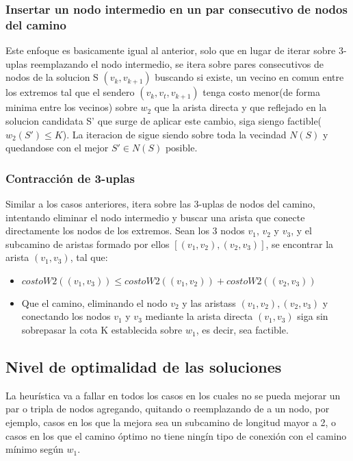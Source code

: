 \subsubsection{Insertar un nodo intermedio en un par consecutivo de nodos del camino}
Este enfoque es basicamente igual al anterior, solo que en lugar de iterar sobre 3-uplas reemplazando el nodo intermedio, se itera sobre pares consecutivos de nodos de la solucion S $(v_k, v_{k+1})$ buscando si existe, un vecino en comun entre los extremos tal que el sendero $(v_k, v_t, v_{k+1})$ tenga costo menor(de forma minima entre los vecinos) sobre $w_2$ que la arista directa y que reflejado en la solucion candidata S' que surge de aplicar este cambio, siga siengo factible($w_2(S') \leq K$). La iteracion de sigue siendo sobre toda la vecindad $N(S)$ y quedandose con el mejor $S' \in N(S)$ posible.


\subsubsection{Contracci\'on de 3-uplas}

Similar a los casos anteriores, itera sobre las 3-uplas de nodos del camino, intentando eliminar el nodo intermedio y buscar una arista que conecte directamente los nodos de los extremos. Sean los 3 nodos $v_1$, $v_2$ y $v_3$, y el subcamino de aristas formado por ellos $[ (v_1, v_2), (v_2, v_3)]$, se encontrar la arista $(v_1, v_3)$, tal que:

\begin{itemize}
	\item $costoW2((v_1, v_3)) \leq costoW2((v_1, v_2)) + costoW2((v_2, v_3))$
	\item Que el camino, eliminando el nodo $v_2$ y las aristass $(v_1, v_2), (v_2, v_3)$ y conectando los nodos $v_1$ y $v_3$ mediante la arista directa $(v_1, v_3)$ siga sin sobrepasar la cota K establecida sobre $w_1$, es decir, sea factible.
\end{itemize}

\subsection{Nivel de optimalidad de las soluciones}

La heur\'istica va a fallar en todos los casos en los cuales no se pueda mejorar un par o tripla de nodos agregando, quitando o reemplazando de a un nodo, por ejemplo, casos en los que la mejora sea un subcamino de longitud mayor a 2, o casos en los que el camino \'optimo no tiene ning\'in tipo de conexi\'on con el camino m\'inimo seg\'un $w_1$.

